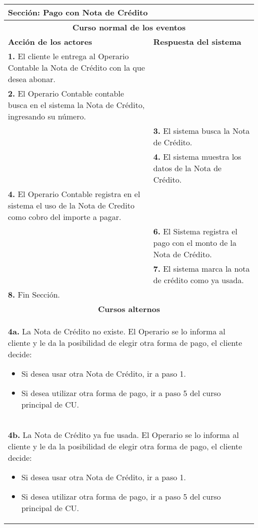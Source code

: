 \documentclass[12pt]{extarticle}
\begin{document}
    \begin{longtable}{ |p{8cm}|p{8cm}| }
        \hline
        \multicolumn{2}{|p{16cm}|}{\textbf{Sección}: Pago con Nota de Crédito}\\
        \hline
        \multicolumn{2}{|c|}{\textbf{Curso normal de los eventos}}\\
        \hline
        \textbf{Acción de los actores} & \textbf{Respuesta del sistema}\\
        \hline
            \textbf{1. } El cliente le entrega al Operario Contable la Nota de Crédito con la que desea abonar.& \\
            \hline
            \textbf{2. } El Operario Contable contable busca en el sistema la Nota de Crédito, ingresando su número.& \\
            \hline
            & \textbf{3. } El sistema busca la Nota de Crédito.\\
            \hline
            & \textbf{4. } El sistema muestra los datos de la Nota de Crédito.\\
            \hline
            \textbf{4. } El Operario Contable registra en el sistema el uso de la Nota de Credito como cobro del importe a pagar.&\\
            \hline
            & \textbf{6. }El Sistema registra el pago con el monto de la Nota de Crédito.\\
            \hline
            & \textbf{7. }El sistema marca la nota de crédito como ya usada.\\
            \hline
            \textbf{8. }Fin Sección.&\\
        \hline
        \multicolumn{2}{|c|}{\textbf{Cursos alternos}}\\
        \hline
        \multicolumn{2}{|p{16cm}|}{\textbf{4a. } La Nota de Crédito no existe. El Operario se lo informa al cliente y le da la posibilidad de elegir otra forma de pago, el cliente decide:
            
            \begin{itemize}
                \item Si desea usar otra Nota de Crédito, ir a paso 1.
                \item Si desea utilizar otra forma de pago, ir a paso 5 del curso principal de CU.
            \end{itemize}}\\
        \hline
        \multicolumn{2}{|p{16cm}|}{\textbf{4b. } La Nota de Crédito ya fue usada. El Operario se lo informa al cliente y le da la posibilidad de elegir otra forma de pago, el cliente decide:
        
            \begin{itemize}
                \item Si desea usar otra Nota de Crédito, ir a paso 1.
                \item Si desea utilizar otra forma de pago, ir a paso 5 del curso principal de CU.
            \end{itemize}}\\
        \hline
    \end{longtable}
\end{document}
